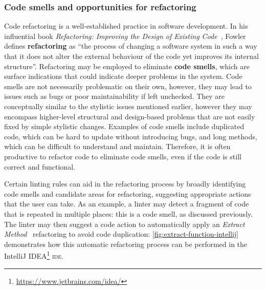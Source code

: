 \documentclass[../../main.tex]{subfiles}
\begin{document}
\subsubsection{Code smells and opportunities for refactoring}
Code refactoring is a well-established practice in software development.
In his influential book \emph{Refactoring: Improving the Design of Existing Code}~\cite{fowler_refactoring_2018}, Fowler defines \textbf{refactoring} as ``the process of changing a software system in such a way that it does not alter the external behaviour of the code yet improves its internal structure''.
Refactoring may be employed to eliminate \textbf{code smells}, which are surface indications that could indicate deeper problems in the system.
Code smells are not necessarily problematic on their own, however, they may lead to issues such as bugs or poor maintainability if left unchecked.
They are conceptually similar to the stylistic issues mentioned earlier, however they may encompass higher-level structural and design-based problems that are not easily fixed by simple stylistic changes.
Examples of code smells include duplicated code, which can be hard to update without introducing bugs, and long methods, which can be difficult to understand and maintain.
Therefore, it is often productive to refactor code to eliminate code smells, even if the code is still correct and functional.

Certain linting rules can aid in the refactoring process by broadly identifying code smells and candidate areas for refactoring, suggesting appropriate actions that the user can take.
As an example, a linter may detect a fragment of code that is repeated in multiple places: this is a code smell, as discussed previously.
The linter may then suggest a code action to automatically apply an \emph{Extract Method}~\cite{fowler_refactoring_2018} refactoring to avoid code duplication: \cref{fig:extract-function-intellij} demonstrates how this automatic refactoring process can be performed in the IntelliJ IDEA\footnote{\url{https://www.jetbrains.com/idea/}} \textsc{ide}.
\end{document}
